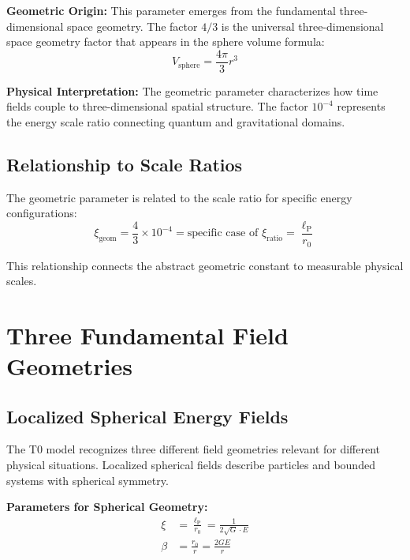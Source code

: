 \documentclass[12pt,a4paper]{report}
\newcommand{\lP}{\ell_{\text{P}}}         %
\newcommand{\rzero}{r_0}                  %
\newcommand{\xigeom}{\xi_{\text{geom}}}   %
\newcommand{\xirat}{\xi_{\text{ratio}}}   %
\begin{document}
	\textbf{Geometric Origin:} This parameter emerges from the fundamental three-dimensional space geometry. The factor $4/3$ is the universal three-dimensional space geometry factor that appears in the sphere volume formula:
	\begin{equation}
		V_{\text{sphere}} = \frac{4\pi}{3}r^3
	\end{equation}
	
	\textbf{Physical Interpretation:} The geometric parameter characterizes how time fields couple to three-dimensional spatial structure. The factor $10^{-4}$ represents the energy scale ratio connecting quantum and gravitational domains.
	
	\subsection{Relationship to Scale Ratios}\label{subsec:geometric_scale_relationship}
	
	The geometric parameter is related to the scale ratio for specific energy configurations:
	\begin{equation}
		\xigeom = \frac{4}{3} \times 10^{-4} = \text{specific case of } \xirat = \frac{\lP}{\rzero}
	\end{equation}
	
	This relationship connects the abstract geometric constant to measurable physical scales.
	
	\section{Three Fundamental Field Geometries}\label{sec:field_geometries}
	
	\subsection{Localized Spherical Energy Fields}\label{subsec:localized_spherical}
	
	The T0 model recognizes three different field geometries relevant for different physical situations. Localized spherical fields describe particles and bounded systems with spherical symmetry.
	
	\textbf{Parameters for Spherical Geometry:}
	\begin{align}
		\xi &= \frac{\lP}{\rzero} = \frac{1}{2\sqrt{G} \cdot E} \label{eq:xi_localized}\\
		\beta &= \frac{\rzero}{r} = \frac{2GE}{r} \label{eq:beta_localized}
	\end{align}
	
\end{document}
